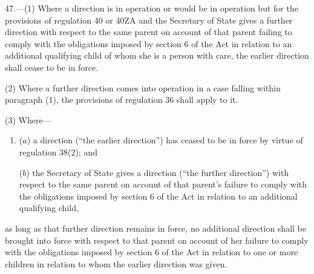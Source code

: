 \documentclass[a4paper,12pt]{article}
\begin{document}
47.—(1) Where a direction is in operation or would be in operation but for the provisions of regulation 40 
or 40ZA  %
and 
the Secretary of State  %
gives a further direction with respect to the same parent on account of that parent failing to comply with the obligations imposed by section 6 of the Act in relation to an additional qualifying child of whom she is a person with care, the earlier direction shall cease to be in force.

(2) Where a further direction comes into operation in a case falling within paragraph (1), the provisions of regulation 36 shall apply to it.


(3) Where—
\begin{enumerate}\item[]
($a$) a direction (“the earlier direction”) has ceased to be in force by virtue of regulation 38(2); and

($b$) 
the Secretary of State  %
gives a direction (“the further direction”) with respect to the same parent on account of that parent’s failure to comply with the obligations imposed by section 6 of the Act in relation to an additional qualifying child,
\end{enumerate}
as long as that further direction remains in force, no additional direction shall be brought into force with respect to that parent on account of her failure to comply with the obligations imposed by section 6 of the Act in relation to one or more children in relation to whom the earlier direction was given.
\end{document}
